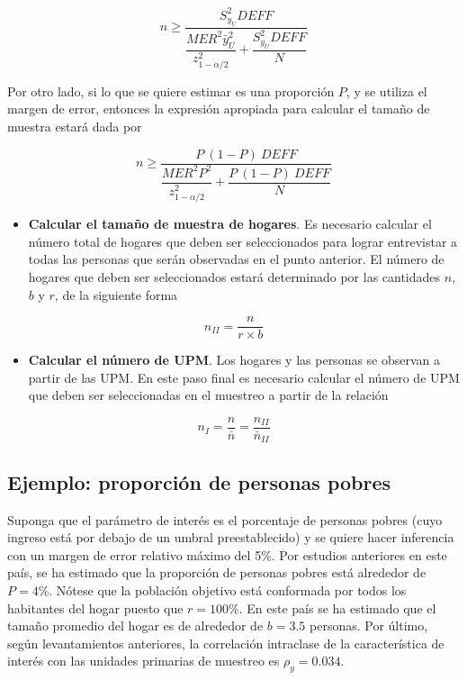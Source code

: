 \documentclass[
  12pt,
  spanish,
]{book}
\providecommand{\tightlist}{%
  \setlength{\itemsep}{0pt}\setlength{\parskip}{0pt}}
\begin{document}
\[
n \geq \dfrac{S^2_{y_U}DEFF}{\dfrac{MER^2 \bar{y}_U^2}{z_{1 - \alpha/2}^2}+\dfrac{S^2_{y_U}DEFF}{N}}
\]

Por otro lado, si lo que se quiere estimar es una proporción \(P\), y se utiliza el margen de error, entonces la expresión apropiada para calcular el tamaño de muestra estará dada por

\[
n \geq \dfrac{P\ (1-P)\ DEFF}{\dfrac{MER^2P^2}{z_{1-\alpha/2}^2}+\dfrac{P\ (1-P) \ DEFF}{N}}
\]

\begin{itemize}
\tightlist
\item
  \textbf{Calcular el tamaño de muestra de hogares}. Es necesario calcular el número total de hogares que deben ser seleccionados para lograr entrevistar a todas las personas que serán observadas en el punto anterior. El número de hogares que deben ser seleccionados estará determinado por las cantidades \(n\), \(b\) y \(r\), de la siguiente forma
\end{itemize}

\[
n_{II} = \dfrac{n}{r \times b}
\]

\begin{itemize}
\tightlist
\item
  \textbf{Calcular el número de UPM}. Los hogares y las personas se observan a partir de las UPM. En este paso final es necesario calcular el número de UPM que deben ser seleccionadas en el muestreo a partir de la relación
\end{itemize}

\[
n_{I} = \frac{n}{\bar{n}} 
= \frac{n_{II}}{\bar{n}_{II}}
\]

\hypertarget{ejemplo-proporciuxf3n-de-personas-pobres}{%
\subsection{Ejemplo: proporción de personas pobres}\label{ejemplo-proporciuxf3n-de-personas-pobres}}

Suponga que el parámetro de interés es el porcentaje de personas pobres (cuyo ingreso está por debajo de un umbral preestablecido) y se quiere hacer inferencia con un margen de error relativo máximo del 5\%. Por estudios anteriores en este país, se ha estimado que la proporción de personas pobres está alrededor de \(P = 4\)\%. Nótese que la población objetivo está conformada por todos los habitantes del hogar puesto que \(r = 100\)\%. En este país se ha estimado que el tamaño promedio del hogar es de alrededor de \(b = 3.5\) personas. Por último, según levantamientos anteriores, la correlación intraclase de la característica de interés con las unidades primarias de muestreo es \(\rho_y = 0.034\).
\end{document}
